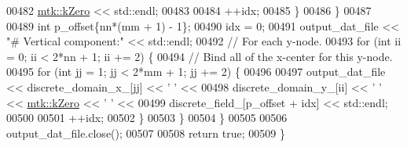 \begin{DoxyCode}
00482           \hyperlink{group__c01-roots_ga59a451a5fae30d59649bcda274fea271}{mtk::kZero} << std::endl;
00483 
00484         ++idx;
00485       \}
00486     \}
00487 
00489     \textcolor{keywordtype}{int} p\_offset\{nn*(mm + 1) - 1\};
00490     idx = 0;
00491     output\_dat\_file << \textcolor{stringliteral}{"# Vertical component:"} << std::endl;
00492     \textcolor{comment}{// For each y-node.}
00493     \textcolor{keywordflow}{for} (\textcolor{keywordtype}{int} ii = 0; ii < 2*nn + 1; ii += 2) \{
00494       \textcolor{comment}{// Bind all of the x-center for this y-node.}
00495       \textcolor{keywordflow}{for} (\textcolor{keywordtype}{int} jj = 1; jj < 2*mm + 1; jj += 2) \{
00496 
00497         output\_dat\_file << discrete\_domain\_x\_[jj] << \textcolor{charliteral}{' '} <<
00498           discrete\_domain\_y\_[ii] << \textcolor{charliteral}{' '} << \hyperlink{group__c01-roots_ga59a451a5fae30d59649bcda274fea271}{mtk::kZero} << \textcolor{charliteral}{' '} <<
00499           discrete\_field\_[p\_offset + idx] << std::endl;
00500 
00501         ++idx;
00502       \}
00503     \}
00504   \}
00505 
00506   output\_dat\_file.close();
00507 
00508   \textcolor{keywordflow}{return} \textcolor{keyword}{true};
00509 \}
\end{DoxyCode}
